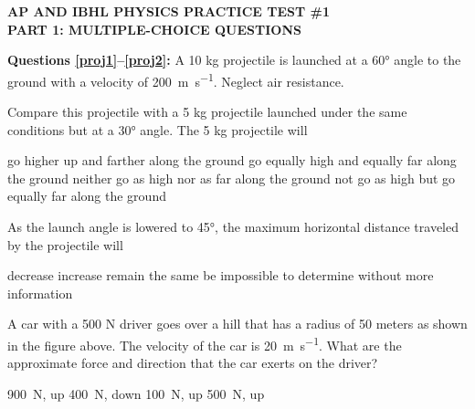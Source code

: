 \documentclass[12pt]{exam}
\newcommand{\pic}[2]{
  \begin{center}
    \texttt{[image: \#2]}
  \end{center}
}
\begin{document}
\begin{center}
  \textbf{AP AND IBHL PHYSICS PRACTICE TEST \#1\\
    PART 1: MULTIPLE-CHOICE QUESTIONS
  }
\end{center}


\textbf{Questions \ref{proj1}--\ref{proj2}:} A 10 kg projectile is launched at
a \ang{60} angle to the ground with a velocity of \SI{200}{\metre\per\second}.
Neglect air resistance.

\begin{questions}
  
  \question Compare this projectile with a 5 kg projectile launched under the
  same conditions but at a \ang{30} angle. The 5 kg projectile will
  \label{proj1}
  \begin{choices}
    \choice go higher up and farther along the ground
    \choice go equally high and equally far along the ground
    \choice neither go as high nor as far along the ground
    \choice not go as high but go equally far along the ground
  \end{choices}
    
  \question As the launch angle is lowered to \ang{45}, the maximum horizontal
  distance traveled by the projectile will
  \label{proj2}
  \begin{choices}
    \choice decrease
    \choice increase
    \choice remain the same
    \choice be impossible to determine without more information
  \end{choices}

  \uplevel{
    \pic{.4}{IMG_20200810_093039201}
  }
  \question A car with a 500 N driver goes over a hill that has a radius of 50
  meters as shown in the figure above. The velocity of the car is
  \SI{20}{\metre\per\second}. What are the approximate force and direction
  that the car exerts on the driver?
  \begin{choices}
    \choice\SI{900}{\newton}, up
    \choice\SI{400}{\newton}, down
    \choice\SI{100}{\newton}, up
    \choice\SI{500}{\newton}, up
  \end{choices}
  

\end{questions}
\end{document}
